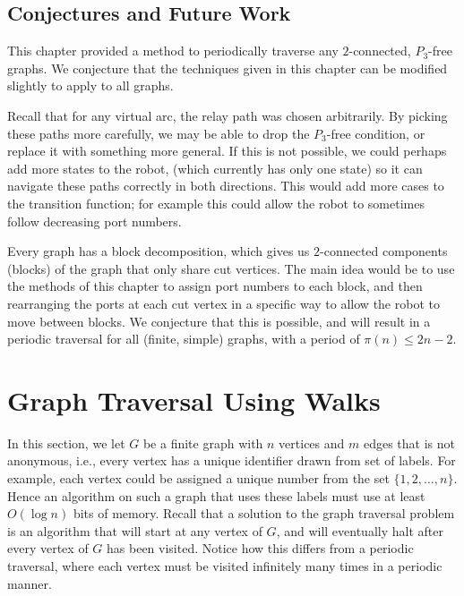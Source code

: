 \documentclass[12pt,letterpaper,oneside]{book}
\begin{document}
\newpage
\section{Conjectures and Future Work}

This chapter provided a method to periodically traverse any $2$-connected, $P_3$-free graphs.  
We conjecture that the techniques given in this chapter can be modified slightly to apply to all graphs.

Recall that for any virtual arc, the relay path was chosen arbitrarily.  By picking these paths more carefully, we may be able 
to drop the $P_3$-free condition, or replace it with something more general.  If this is not possible, we could perhaps add more states 
to the robot, (which currently has only one state) so it can navigate these paths correctly in both directions.  This would 
add more cases to the transition function; for example this could allow the robot to sometimes follow decreasing port numbers.    

Every graph has a block decomposition, which gives us $2$-connected components (blocks) of the graph that only share cut vertices.  The 
main idea would be to use the methods of this chapter to 
assign port numbers to each block, and then rearranging the ports at each cut vertex in a specific way to allow the robot to move between 
blocks.  We conjecture that this is possible, and will result in a periodic traversal for all (finite, simple) graphs, with a period of 
$\pi(n)\le 2n-2$.  







\chapter{Graph Traversal Using Walks} %
\label{sec-geo}



In this section, we let $G$ be a finite graph with $n$ vertices and $m$ edges 
that is not anonymous, i.e., every vertex has a unique identifier drawn from set 
of labels.  For example, each vertex could be assigned a unique number from the set $\{1,2,\ldots,n\}$.  Hence an algorithm on such a 
graph that uses these labels must use at least $O(\log n)$ bits of memory.  
Recall that a solution to the graph traversal problem is an algorithm that will start at any vertex of $G$, and will eventually halt after 
every vertex of $G$ has been visited.  Notice how this differs from a periodic traversal, where each vertex must be visited infinitely many 
times in a periodic manner.  
\end{document}
